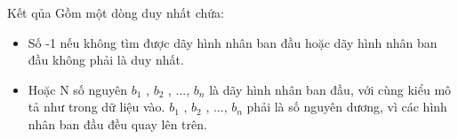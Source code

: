 Kết qủa
Gồm một dòng duy nhất chứa:  
\begin{itemize}
	\item     Số -1 nếu không tìm được dãy hình nhân ban đầu hoặc dãy hình nhân ban đầu không phải là duy nhất.   
	\item     Hoặc N số nguyên $b_{1}$    , $b_{2}$    , ..., $b_{n}$    là dãy hình nhân ban đầu, với cùng kiểu mô tả như trong dữ liệu vào. $b_{1}$    , $b_{2}$    , ..., $b_{n}$    phải là số nguyên dương, vì các hình nhân ban đầu đều quay lên trên.   
\end{itemize}